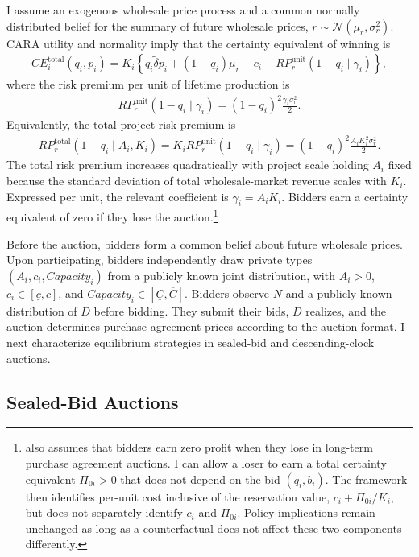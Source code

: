 \documentclass[10pt]{article}
\theoremstyle{plain}
\theoremstyle{definition}
\begin{document}
I assume an exogenous wholesale price process and a common normally
distributed belief for the summary of future wholesale prices,
$r\sim\mathcal{N}(\mu_r,\sigma_r^2)$. CARA utility and normality imply that the
certainty equivalent of winning is
\begin{align}
\label{eq:ce}
CE_i^{\mathrm{total}}(q_i,p_i)
=K_i\left\{
q_i\widetilde{\delta}p_i+(1-q_i)\mu_r-c_i
-RP_r^{\mathrm{unit}}(1-q_i\mid\gamma_i)
\right\},
\end{align}
where the risk premium per unit of lifetime production is
\begin{align}
\label{eq:riskpremiumunit}
RP_r^{\mathrm{unit}}(1-q_i\mid\gamma_i)
=(1-q_i)^2\frac{\gamma_i\sigma_r^2}{2}.
\end{align}
Equivalently, the total project risk premium is
\begin{align*}
RP_r^{\mathrm{total}}(1-q_i\mid A_i,K_i)
=K_iRP_r^{\mathrm{unit}}(1-q_i\mid\gamma_i)
=(1-q_i)^2\frac{A_iK_i^2\sigma_r^2}{2}.
\end{align*}
The total risk premium increases quadratically with project scale holding
$A_i$ fixed because the standard deviation of total wholesale-market revenue
scales with $K_i$. Expressed per unit, the relevant coefficient is
$\gamma_i=A_iK_i$. Bidders earn a certainty equivalent of zero if they lose
the auction.\footnote{
\citet{Ryan2026} also assumes that bidders earn zero profit when they lose in
long-term purchase agreement auctions. I can allow a loser to earn a total
certainty equivalent $\Pi_{0i}>0$ that does not depend on the bid
$(q_i,b_i)$. The framework then identifies per-unit cost inclusive of the
reservation value, $c_i+\Pi_{0i}/K_i$, but does not separately identify
$c_i$ and $\Pi_{0i}$. Policy implications remain unchanged as long as a
counterfactual does not affect these two components differently.
}

Before the auction, bidders form a common belief about future wholesale
prices. Upon participating, bidders independently draw private types
$(A_i,c_i,Capacity_i)$ from a publicly known joint distribution, with
$A_i>0$, $c_i\in[\underline{c},\overline{c}]$, and
$Capacity_i\in[\underline{C},\overline{C}]$. Bidders observe $N$ and a
publicly known distribution of $D$ before bidding. They submit their bids,
$D$ realizes, and the auction determines purchase-agreement prices according
to the auction format. I next characterize equilibrium strategies in
sealed-bid and descending-clock auctions.



\subsection{Sealed-Bid Auctions}
\label{sec:sb}
\end{document}
